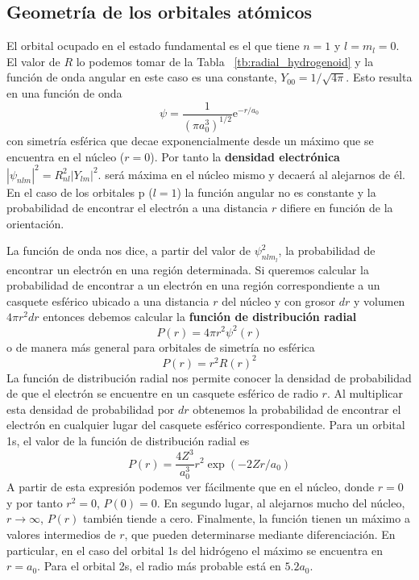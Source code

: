 \subsection{Geometría de los orbitales atómicos}
El orbital ocupado en el estado fundamental es el que tiene $n=1$
y $l=m_l=0$. El valor de $R$ lo podemos tomar de la Tabla~
\ref{tb:radial_hydrogenoid} y la función de onda angular en 
este caso es una constante, $Y_{00}=1/\sqrt{4\pi}$.
Esto resulta en una función de onda 
\begin{equation}
    \psi=\frac{1}{(\pi a_0^3)^{1/2}}\mathrm{e}^{-r/a_0}
\end{equation}
con simetría esférica que decae exponencialmente desde un máximo
que se encuentra en el núcleo ($r=0$). Por tanto la \textbf{densidad 
electrónica} $|\psi_{nlm}|^2=R^2_{nl}|Y_{lm}|^2$. 
será máxima en el núcleo mismo y decaerá al alejarnos de él. 
En el caso de los orbitales p ($l=1$) la función angular no 
es constante y la probabilidad de encontrar el electrón a 
una distancia $r$ difiere en función de la orientación.

La función de onda nos dice, a partir del valor de $\psi_{nlm_l}^2$,
la probabilidad de encontrar un electrón en una región determinada.
Si queremos calcular la probabilidad de encontrar a un electrón
en una región correspondiente a un casquete esférico ubicado 
a una distancia $r$ del núcleo y con grosor $dr$ y volumen 
$4\pi r^2dr$ entonces debemos calcular la \textbf{función de distribución 
radial}
\begin{equation}
    P(r)=4\pi r^2\psi^2(r)
\end{equation}
o de manera más general para orbitales de simetría no esférica
\begin{equation}
    P(r)=r^2R(r)^2
\end{equation}
La función de distribución radial  nos permite conocer la densidad de
probabilidad de que el electrón
se encuentre en un casquete esférico de radio $r$. Al multiplicar
esta densidad de probabilidad por $dr$ obtenemos la probabilidad de
encontrar el electrón en cualquier lugar del casquete esférico 
correspondiente. Para un orbital 1s, el valor de la función de
distribución radial es 
\begin{equation}
    P(r)=\frac{4Z^3}{a_0^3}r^2\exp{(-2Zr/a_0)}
\end{equation}
A partir de esta expresión podemos ver fácilmente que en el núcleo, donde
$r=0$ y por tanto $r^2=0$, $P(0)=0$. En segundo lugar, al alejarnos mucho
del núcleo, $r\xrightarrow{}\infty$, $P(r)$ también tiende a cero. Finalmente,
la función tienen un máximo a valores intermedios de $r$, que pueden determinarse
mediante diferenciación. En particular, en el caso del orbital 1s del
hidrógeno el máximo se encuentra en $r=a_0$. Para el orbital 2s, el radio
más probable está en $5.2a_0$. 

